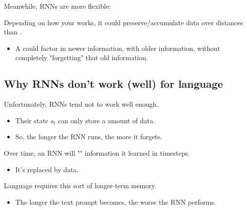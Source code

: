         Meanwhile, RNNs are more flexible:\\

        \begin{concept}
            Depending on how your  works, it could preserve/accumulate data over  distances than .
        \end{concept}

        \begin{itemize}
            \item \miniex A  could factor in newer information, with older information, without completely "forgetting" that old information.
        \end{itemize}


    \phantom{}

    \subsection{Why RNNs don't work (well) for language}

        Unfortunately, RNNs tend not to work well enough.
        
        \begin{itemize}
            \item Their state $s_t$ can only store a  amount of data.

            \item So, the longer the RNN runs, the more it forgets.\\
        \end{itemize}

        \begin{concept}
            Over time, an RNN will "" information it learned in  timesteps.

            \begin{itemize}
                \item It's replaced by  data.
            \end{itemize}
        \end{concept}

        Language requires this sort of longer-term memory.
        
        \begin{itemize}
            \item The longer the text prompt becomes, the worse the RNN performs.
        \end{itemize}

